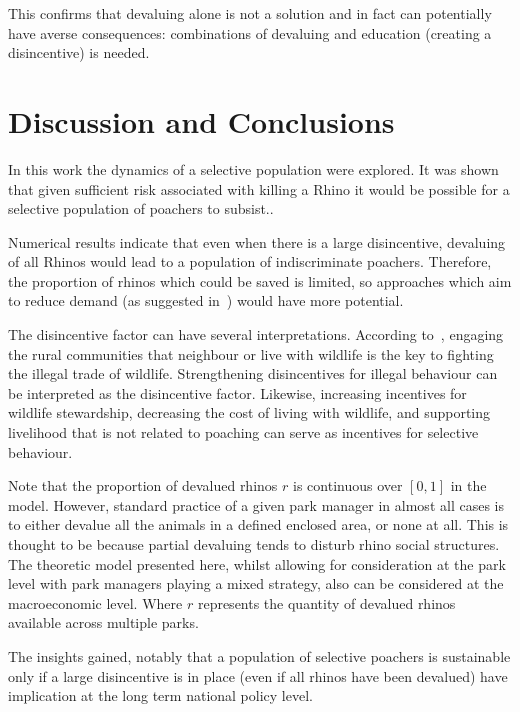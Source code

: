 \documentclass[10pt]{article}
\begin{document}
This confirms that devaluing alone is not a solution and in fact can
potentially have averse consequences: combinations of devaluing and
education (creating a disincentive) is needed.

\section{Discussion and Conclusions}
\label{section:discussion}


In this work the dynamics of a selective population were explored. It was shown
that given sufficient risk associated with killing a Rhino it would be possible
for a selective population of poachers to subsist..

Numerical results indicate that even when there is a large disincentive,
devaluing of all Rhinos would lead to a population of indiscriminate poachers.
Therefore, the proportion of rhinos
which could be saved is limited, so approaches which aim to reduce demand (as
suggested in~\cite{Duan2013}) would have more potential.

The disincentive factor can have several interpretations. According to~\cite{Duan2017},
engaging the rural communities that neighbour or live with wildlife is the
key to fighting the illegal trade of wildlife. Strengthening disincentives for
illegal behaviour can be interpreted as the disincentive factor. Likewise,
increasing incentives for wildlife stewardship, decreasing the cost of living
with wildlife, and supporting livelihood that is not related to poaching can
serve as incentives for selective behaviour.

Note that the proportion of devalued rhinos \(r\) is continuous over \([0, 1]\)
in the model. However, standard practice of a given park manager in almost all
cases is to either devalue all the animals in a defined enclosed area, or none
at all. This is thought to be because partial devaluing tends to disturb
rhino social structures. The theoretic model presented here, whilst allowing for
consideration at the park level with park managers playing a mixed strategy, also
can be considered at the macroeconomic level. Where \(r\) represents the quantity
of devalued rhinos available across multiple parks.

The insights gained, notably that a population of selective poachers is
sustainable only if a large disincentive is in place (even if all rhinos have
been devalued) have implication at the long term national policy level.
\end{document}
